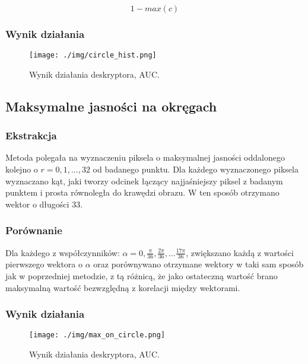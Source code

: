 \documentclass[a4paper,11pt]{article}
\begin{document}
$$ 1-max(c) $$

\subsubsection{Wynik działania}

\begin{figure}[H]
\begin{center}
\texttt{[image: ./img/circle\_hist.png]}
\end{center}
\caption{Wynik działania deskryptora, AUC.}
\end{figure}

\subsection{Maksymalne jasności na okręgach}

\subsubsection{Ekstrakcja}
Metoda polegała na wyznaczeniu piksela o maksymalnej jasności oddalonego kolejno o $r = 0,1,...,32$ od badanego punktu.
Dla każdego wyznaczonego piksela wyznaczano kąt, jaki tworzy odcinek łączący najjaśniejszy piksel z badanym punktem i prosta równoległa do krawędzi obrazu. 
W ten sposób otrzymano wektor o długości $33$.

\subsubsection{Porównanie}
Dla każdego z współczynników: $\alpha = 0, \frac{\pi}{36}, \frac{2\pi}{36},...\frac{17\pi}{36}$, zwiększano każdą z wartości pierwszego wektora o $\alpha$ oraz porównywano otrzymane wektory w taki sam sposób jak w poprzedniej metodzie, z tą różnicą, że jako ostateczną wartość brano maksymalną wartość bezwzględną z korelacji między wektorami.


\subsubsection{Wynik działania}

\begin{figure}[H]
\begin{center}
\texttt{[image: ./img/max\_on\_circle.png]}
\end{center}
\caption{Wynik działania deskryptora, AUC.}
\end{figure}
\end{document}
